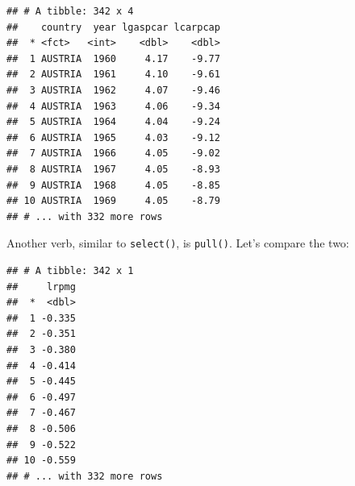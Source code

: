 \documentclass[]{gitbook}
\newenvironment{Shaded}{\begin{snugshade}}{\end{snugshade}}
\newcommand{\KeywordTok}[1]{\textcolor[rgb]{0.13,0.29,0.53}{\textbf{#1}}}
\newcommand{\NormalTok}[1]{#1}
\newcommand{\OperatorTok}[1]{\textcolor[rgb]{0.81,0.36,0.00}{\textbf{#1}}}
\newcommand{\StringTok}[1]{\textcolor[rgb]{0.31,0.60,0.02}{#1}}
\theoremstyle{definition}
\theoremstyle{definition}
\theoremstyle{definition}
\theoremstyle{remark}
\begin{document}
\begin{verbatim}
## # A tibble: 342 x 4
##    country  year lgaspcar lcarpcap
##  * <fct>   <int>    <dbl>    <dbl>
##  1 AUSTRIA  1960     4.17    -9.77
##  2 AUSTRIA  1961     4.10    -9.61
##  3 AUSTRIA  1962     4.07    -9.46
##  4 AUSTRIA  1963     4.06    -9.34
##  5 AUSTRIA  1964     4.04    -9.24
##  6 AUSTRIA  1965     4.03    -9.12
##  7 AUSTRIA  1966     4.05    -9.02
##  8 AUSTRIA  1967     4.05    -8.93
##  9 AUSTRIA  1968     4.05    -8.85
## 10 AUSTRIA  1969     4.05    -8.79
## # ... with 332 more rows
\end{verbatim}

Another verb, similar to \texttt{select()}, is \texttt{pull()}. Let's
compare the two:

\begin{Shaded}
\end{Shaded}

\begin{verbatim}
## # A tibble: 342 x 1
##     lrpmg
##  *  <dbl>
##  1 -0.335
##  2 -0.351
##  3 -0.380
##  4 -0.414
##  5 -0.445
##  6 -0.497
##  7 -0.467
##  8 -0.506
##  9 -0.522
## 10 -0.559
## # ... with 332 more rows
\end{verbatim}

\begin{Shaded}
\end{Shaded}
\end{document}
